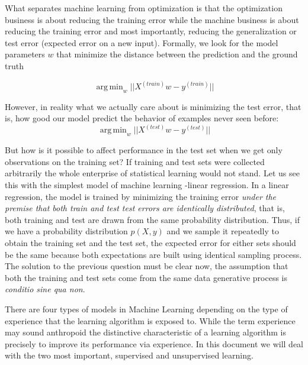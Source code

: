 \documentclass[11pt]{article}
\theoremstyle{definition}
\theoremstyle{remark}
\DeclareMathOperator*{\argmin}{arg\,min}
\begin{document}
What separates machine learning from optimization is that the optimization business is about reducing the training error while the machine business is about reducing the training error and most importantly, reducing the generalization or test error (expected error on a new input). 
Formally, we look for the model parameters $w$ that minimize the distance between the prediction and the ground truth

\begin{equation}
\argmin_{w} ||X^{(train)}w - y^{(train)}||
\label{eq:reaintest1}
\end{equation}

However, in reality what we actually care about is minimizing the test error, that is, how good our model predict the behavior of examples never seen before:
\begin{equation}
\argmin_{w} ||X^{(test)}w - y^{(test)}||
\end{equation}

But how is it possible to affect performance in the test set when we get only observations on the training set? If training and test sets were collected arbitrarily the whole enterprise of statistical learning would not stand. 
Let us see this with the simplest model of machine learning -linear regression. In a linear regression, the model is trained by minimizing the training error \emph{under the premise that both train and test test errors are identically distributed}, that is, both training and test are drawn from the same probability distribution. Thus, if we have a probability distribution $p(X,y)$ and we sample it repeatedly to obtain the training set and the test set, the expected error for either sets should be the same because both expectations are built using identical sampling process. The solution to the previous question must be clear now, the assumption that both the training and test sets come from the same data generative process is \emph{conditio sine qua non}.

There are four types of models in Machine Learning depending on the type of experience that the learning algorithm is exposed to. 
While the term experience may sound anthropoid the distinctive characteristic of a learning algorithm is precisely to improve its performance via experience. In this document we will deal with the two most important, supervised and unsupervised learning.
\end{document}
